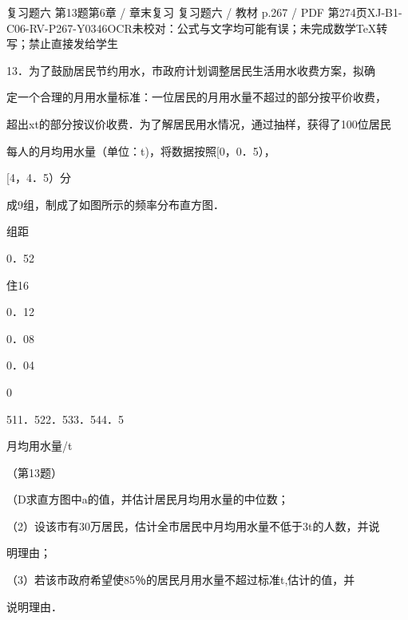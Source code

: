 \begin{bankitem}{复习题六 第13题}{第6章 / 章末复习 复习题六 / 教材 p.267 / PDF 第274页}{XJ-B1-C06-RV-P267-Y0346}{OCR未校对：公式与文字均可能有误；未完成数学TeX转写；禁止直接发给学生}
\begin{ocrdraft}
\par
13．为了鼓励居民节约用水，市政府计划调整居民生活用水收费方案，拟确
\par
定一个合理的月用水量标准：一位居民的月用水量不超过的部分按平价收费，
\par
超出xt的部分按议价收费．为了解居民用水情况，通过抽样，获得了100位居民
\par
每人的月均用水量（单位：t)，将数据按照[0，0．5），
\par
[4，4．5）分
\par
成9组，制成了如图所示的频率分布直方图．
\par
组距
\par
0．52
\par
住16
\par
0．12
\par
0．08
\par
0．04
\par
0
\par
511．522．533．544．5
\par
月均用水量/t
\par
（第13题）
\par
（D求直方图中a的值，并估计居民月均用水量的中位数；
\par
（2）设该市有30万居民，估计全市居民中月均用水量不低于3t的人数，并说
\par
明理由；
\par
（3）若该市政府希望使85％的居民月用水量不超过标准t,估计的值，并
\par
说明理由．
\end{ocrdraft}
\end{bankitem}
